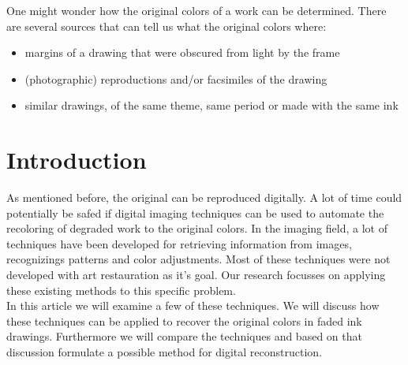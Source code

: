 	One might wonder how the original colors of a work can be determined.
	There are several sources that can tell us what the original colors where:

	\begin{itemize}
		\item margins of a drawing that were obscured from light by the frame
		\item (photographic) reproductions and/or facsimiles of the drawing
		\item similar drawings, of the same theme, same period or made with the same ink
	\end{itemize}

\section{Introduction}

	As mentioned before, the original can be reproduced digitally.
	A lot of time could potentially be safed if digital imaging techniques can be used to automate
	the recoloring of degraded work to the original colors.
	In the imaging field, a lot of techniques have been developed for retrieving information
	from images, recognizings patterns and color adjustments.
	Most of these techniques were not developed with art restauration as it's goal.
	Our research focusses on applying these existing methods to this specific problem. \\

	In this article we will examine a few of these techniques.
	We will discuss how these techniques can be applied to recover the original colors
	in faded ink drawings.
	Furthermore we will compare the techniques and based on that discussion formulate a possible
	method for digital reconstruction.
